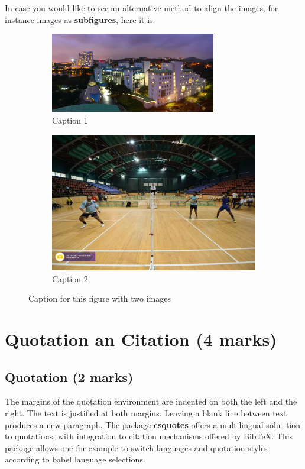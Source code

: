 \documentclass[a4paper, 12pt, fullpage]{article}
\begin{document}
In case you would like to see an alternative method to align the images, for instance images as \textbf{subfigures}, here it is.

\begin{figure}[H]
\begin{subfigure}{.5\textwidth}
  \centering
  \includegraphics[width=.85\linewidth, height=3.5cm]{3.jpg}
  \caption{Caption 1}
  \label{fig:sub1}
\end{subfigure}%
\begin{subfigure}{.5\textwidth}
  \centering
  \includegraphics[width=.85\linewidth]{4.jpg}
  \caption{Caption 2}
  \label{fig:sub2}
\end{subfigure}
\caption{Caption for this figure with two images}
\label{fig:test}
\end{figure}

\newpage
\section{Quotation an Citation (4 marks)}

\subsection{Quotation (2 marks)}
The margins of the quotation environment are indented on both the left and the
right. The text is justified at both margins. Leaving a blank line between text
produces a new paragraph. The package \textbf{csquotes} offers a multilingual solu-
tion to quotations, with integration to citation mechanisms offered by BibTeX.
This package allows one for example to switch languages and quotation styles
according to babel language selections.
\end{document}

